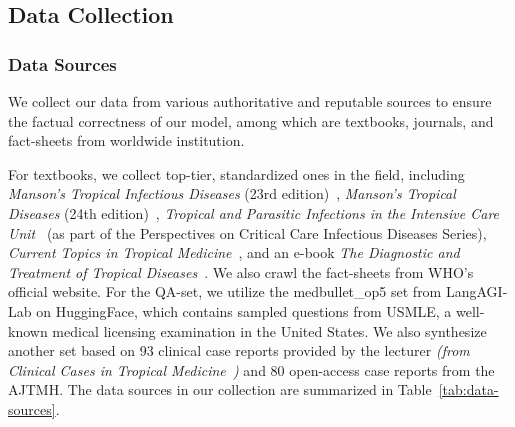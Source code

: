 \subsection{Data Collection}
\label{sec:data-collection}

\subsubsection{Data Sources}

We collect our data from various authoritative and reputable sources to ensure the factual correctness of our model,
among which are textbooks, journals, and fact-sheets from worldwide institution.

For textbooks, we collect top-tier, standardized ones in the field, including 
\textit{Manson's Tropical Infectious Diseases} (23rd edition)~\cite{farrar2014manson}, 
\textit{Manson's Tropical Diseases} (24th edition)~\cite{farrar2023manson},
\textit{Tropical and Parasitic Infections in the Intensive Care Unit}~\cite{feldman2005tropical} 
(as part of the Perspectives on Critical Care Infectious Diseases Series), 
\textit{Current Topics in Tropical Medicine}~\cite{rodriguez2012current}, and an e-book \textit{The Diagnostic and Treatment of Tropical Diseases}~\cite{gutenberg}. 
We also crawl the fact-sheets from \ac{WHO}'s official website. 
For the QA-set, we utilize the medbullet\_op5 set from LangAGI-Lab on HuggingFace, 
which contains sampled questions from \ac{USMLE}, a well-known medical licensing examination in the United States.
We also synthesize another set based on 93 clinical case reports provided by the lecturer \textit{(from Clinical Cases in Tropical Medicine~\cite{whitty2024clinical})} and 
80 open-access case reports from the \ac{AJTMH}.
The data sources in our collection are summarized in Table~\ref{tab:data-sources}.

